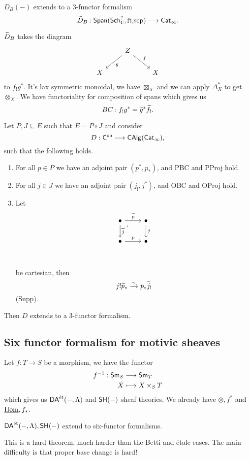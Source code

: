 \begin{fact}
$D_B(-)$ extends to a 3-functor formalism
\[
\wt{D}_B:\cat{Span}(\cat{Sch}_\C^{?},\text{ft,sep})\to \cat{Cat}_\infty. %
\]
\end{fact}
$\widetilde{D}_B$ takes the diagram
\[
\begin{tikzcd}
& Z \ar[dl,"g"] \ar[dr,"f"] \\
X & & X
\end{tikzcd}
\]
to $f_!g^{*}$. It's lax symmetric monoidal, we have $\boxtimes_X$ and we can apply
$\Delta_X^{*}$ to get $\otimes_X$. We have functoriality for composition of spans which gives us
\[
BC:f_!g^{*} = \widetilde{g}^{*}\widetilde{f}_!.
\]
\begin{theorem}[Fake]
Let $P,J\subseteq E$ such that $E=P\circ J$ and consider
\[
D:\C\op \to \cat{CAlg}(\cat{Cat}_\infty),
\]
such that the following holds.
\begin{enumerate}[1)]
\item For all $p\in P$ we have an adjoint pair $(p^{*},p_*)$, and PBC and PProj hold.
\item For all $j\in J$ we have an adjoint pair $(j_!,j^{*})$, and OBC and OProj hold.
\item Let
\[
\begin{tikzcd}
\bullet \ar[r,"\wt{p}"] \ar[d,"\wt{j}"] & \bullet \ar[d,"j"] \\
\bullet \ar[r,"p"] & \bullet\\
\arrow["\lrcorner"{anchor=center, pos=0.125},
draw=none, from=1-1, to=2-2]
\end{tikzcd}
\]
be cartesian, then
\[
j!\widetilde{p}_* \xrightarrow{\sim} p_*\widetilde{j}_!
\]
(Supp).
\end{enumerate}
Then $D$ extends to a 3-functor formalism.
\end{theorem}
\subsection{Six functor formalism for motivic sheaves}
Let $f:T\to S$ be a morphism, we have the functor
\begin{align*}
f^{-1}: \mathsf{Sm}_S &\longrightarrow \mathsf{Sm}_T \\
X &\longmapsto X\times_S T
\end{align*}
which gives us $\mathsf{DA}^\text{\'et}(-,\Lambda)$ and $\mathsf{SH}(-)$ sheaf theories. We already have $\otimes,
f^{*}$ and $\underline{\operatorname{Hom}},f_*$.
\begin{theorem}
$\mathsf{DA}^\text{\'et}(-,\Lambda), \mathsf{SH}(-)$ extend to six-functor formalisms.
\end{theorem}
This is a hard theorem, much harder than the Betti and \'etale cases. The main difficulty
is that proper base change is hard!

